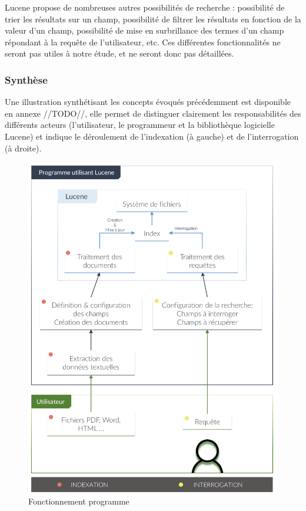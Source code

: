Lucene propose de nombreuses autres possibilités de recherche : possibilité de trier les résultats sur un champ, possibilité de filtrer les résultats en fonction de la valeur d’un champ, possibilité de mise en surbrillance des termes d’un champ répondant à la requête de l’utilisateur, etc. Ces différentes fonctionnalités ne seront pas utiles à notre étude, et ne seront donc pas détaillées.

\subsubsection{Synthèse}

Une illustration synthétisant les concepts évoqués précédemment est disponible en annexe //TODO//, elle permet de distinguer clairement les responsabilités des différents acteurs (l’utilisateur, le programmeur et la bibliothèque logicielle Lucene) et indique le déroulement de l’indexation (à gauche) et de l'interrogation (à droite).

 \begin{figure}[h]
            \centering
            \includegraphics[width=12cm]{figure/fonctionnement.jpg}
            \caption{Fonctionnement programme}
            \label{fig:fonctionnement_prog}
 \end{figure}

